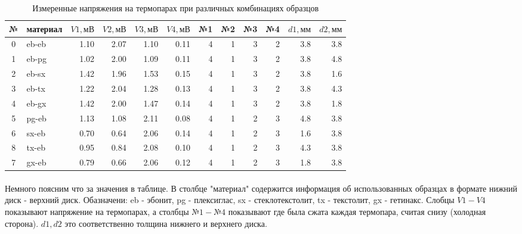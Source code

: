 \documentclass[a4paper, 12pt]{article}
\begin{document}
    \begin{table}[h]
        \begin{center}
            \begin{tabular}{|c|l|rrrr|rrrr|rr|}
                \hline
                {№} & материал & $V1, мВ$ & $V2, мВ$ & $V3, мВ$ & $V4, мВ$ &  №1 &  №2 &  №3 &  №4 &   $d1, мм$ &   $d2, мм$ \\
                \hline
                0 &    eb-eb &  1.10 &  2.07 &  1.10 &  0.11 &   4 &   1 &   3 &   2 &  3.8 &  3.8 \\\hline
                1 &    eb-pg &  1.02 &  2.00 &  1.09 &  0.11 &   4 &   1 &   3 &   2 &  3.8 &  4.8 \\
                2 &    eb-sx &  1.42 &  1.96 &  1.53 &  0.15 &   4 &   1 &   3 &   2 &  3.8 &  1.6 \\
                3 &    eb-tx &  1.22 &  2.04 &  1.28 &  0.13 &   4 &   1 &   3 &   2 &  3.8 &  4.3 \\
                4 &    eb-gx &  1.42 &  2.00 &  1.47 &  0.14 &   4 &   1 &   3 &   2 &  3.8 &  1.8 \\\hline
                5 &    pg-eb &  1.13 &  1.08 &  2.11 &  0.08 &   4 &   1 &   2 &   3 &  4.8 &  3.8 \\
                6 &    sx-eb &  0.70 &  0.64 &  2.06 &  0.14 &   4 &   1 &   2 &   3 &  1.6 &  3.8 \\
                8 &    tx-eb &  0.95 &  0.84 &  2.08 &  0.10 &   4 &   1 &   2 &   3 &  4.3 &  3.8 \\
                7 &    gx-eb &  0.79 &  0.66 &  2.06 &  0.12 &   4 &   1 &   2 &   3 &  1.8 &  3.8 \\
                \hline
            \end{tabular}
        \end{center}
        \caption{Измеренные напряжения на термопарах при различных комбинациях образцов}
    \end{table}

    \paragraph{}
    Немного поясним что за значения в таблице. В столбце "материал" содержится информация об использованных образцах в формате нижний диск - верхний диск. Обазначени: eb - эбонит, pg - плексиглас, sx - стеклотекстолит, tx - текстолит, gx - гетинакс. Слобцы $V1-V4$ показывают напряжение на термопарах, а столбцы $№1-№4$ показывают где была сжата каждая термопара, считая снизу (холодная сторона).
    $d1, d2$ это соответственно толщина нижнего и верхнего диска.
\end{document}

